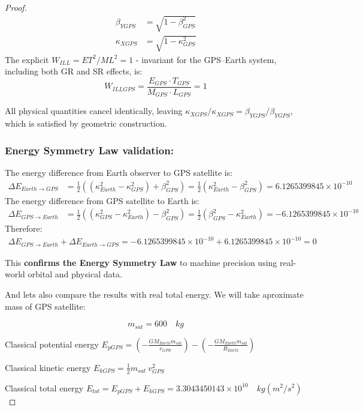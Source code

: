 \documentclass[12pt, a4paper]{article}
\begin{document}
\begin{proof}
\begin{align*}
\beta_{YGPS} &= \sqrt{1-\beta_{GPS}^2} \\

\kappa_{XGPS} &= \sqrt{1-\kappa_{GPS}^2}

\end{align*}
The explicit $W_{ILL}=ET^2 / ML^2=1$ - invariant for the GPS–Earth system, including both GR and SR effects, is:  $$W_{ILLGPS}=\frac{E_{GPS} \cdot T_{GPS}}{M_{GPS} \cdot L_{GPS}} =  1$$

All physical quantities cancel identically, leaving $ \kappa_{XGPS}/\kappa_{XGPS} = \beta_{YGPS}/\beta_{YGPS}$, which is satisfied by geometric construction.

\subsubsection{Energy Symmetry Law validation:}

The energy difference from Earth observer to GPS satellite is:
\begin{align}
\Delta E_{Earth \rightarrow GPS} &= \frac{1}{2}((\kappa^2_{Earth} - \kappa^2_{GPS}) + \beta^2_{GPS})
= \frac{1}{2}(\kappa^2_{Earth} - \beta^2_{GPS}) =  6.1265399845\times10^{-10}
\end{align}
The energy difference from GPS satellite to Earth is:
\begin{align}
\Delta E_{GPS \rightarrow Earth} &= \frac{1}{2}( (\kappa^2_{GPS} - \kappa^2_{Earth}) - \beta^2_{GPS}) = \frac{1}{2}( \beta^2_{GPS} - \kappa^2_{Earth}) = -6.1265399845\times10^{-10}
\end{align}
Therefore:
\begin{align}
\Delta E_{GPS \rightarrow Earth}+\Delta E_{Earth \rightarrow GPS}  = -6.1265399845\times10^{-10} + 6.1265399845\times10^{-10} = 0
\end{align}

This \textbf{confirms the Energy Symmetry Law} to machine precision using real-world orbital and physical data.

And lets also compare the results with real total energy. We will take aproximate mass of GPS satellite:

\[
m_{sat}=600 \quad kg
\]

Classical potential energy   $E_{pGPS}=(-\frac{GM_{Earth}m_{sat}}{r_{GPS}})-(-\frac{GM_{Earth}m_{sat}}{R_{Earth}})$

Classical kinetic energy     $E_{kGPS}=\frac{1}{2}m_{sat}\ v_{GPS}^{2}$

Classical total energy   $E_{tot}=E_{pGPS}+E_{kGPS} = 3.3043450143\times10^{10}  \quad    kg   (m^2
/ s^2)$


\end{proof}
\end{document}
